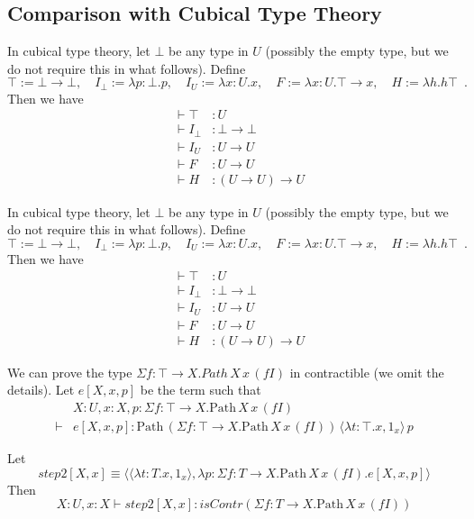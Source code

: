 \documentclass[a4paper,UKenglish]{lipics-v2016}
\newcommand{\Path}[3]{\ensuremath{\mathrm{Path} \, {#1} \, {#2} \, {#3}}}
\theoremstyle{plain}
\begin{document}
\subsection{Comparison with Cubical Type Theory}

In cubical type theory, let $\bot$ be any type in $U$ (possibly the empty type, but we do not require this in what follows).  Define
\[ \top := \bot \rightarrow \bot, \quad I_\bot := \lambda p:\bot.p, \quad I_U := \lambda x:U.x, \quad F := \lambda x:U.\top \rightarrow x, \quad H := \lambda h.h \top \enspace . \]
Then we have
\begin{align*}
& \vdash \top & : U \\
& \vdash I_\bot & : \bot \rightarrow \bot \\
& \vdash I_U & : U \rightarrow U \\
& \vdash F & : U \rightarrow U \\
& \vdash H & : (U \rightarrow U) \rightarrow U
\end{align*}

In cubical type theory, let $\bot$ be any type in $U$ (possibly the empty type, but we do not require this in what follows).  Define
\[ \top := \bot \rightarrow \bot, \quad I_\bot := \lambda p:\bot.p, \quad I_U := \lambda x:U.x, \quad F := \lambda x:U.\top \rightarrow x, \quad H := \lambda h.h \top \enspace . \]
Then we have
\begin{align*}
& \vdash \top & : U \\
& \vdash I_\bot & : \bot \rightarrow \bot \\
& \vdash I_U & : U \rightarrow U \\
& \vdash F & : U \rightarrow U \\
& \vdash H & : (U \rightarrow U) \rightarrow U
\end{align*}

We can prove the type $\Sigma f:\top \rightarrow X. Path \, X \, x \, (f I)$ in contractible (we omit the details).  Let $e[X, x, p]$ be the term such that
\begin{align*} & X : U, x : X, p : \Sigma f:\top \rightarrow X. \Path{X}{x}{(fI)} \\
\vdash & e[X, x, p] : \Path{(\Sigma f:\top \rightarrow X. \Path{X}{x}{(f I)})}{\langle \lambda t : \top . x, 1_x \rangle}{p}
\end{align*}

Let
\[ step2[X,x] \equiv \langle \langle \lambda t : T.x, 1_x \rangle,
\lambda p : \Sigma f : T \rightarrow X. \Path{X}{x}{(fI)}. e[X, x, p] \rangle \]
Then
\[ X : U, x : X \vdash step2[X, x] : isContr(\Sigma f:T \rightarrow X. \Path{X}{x}{(fI)}) \]
\end{document}
